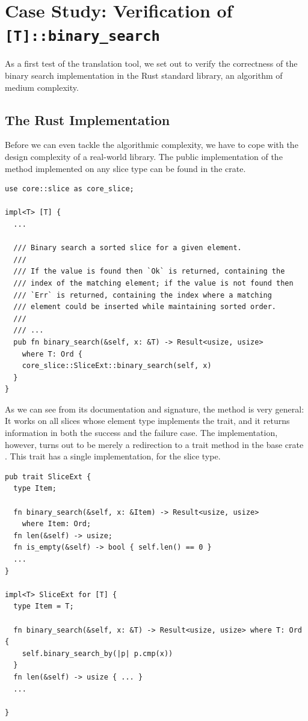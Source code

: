 \section{Case Study: Verification of \texttt{[T]::binary\_search}}
\label{sec:binary_search}

As a first test of the translation tool, we set out to verify the correctness
of the binary search implementation in the Rust standard library, an algorithm of
medium complexity.

\subsection{The Rust Implementation}

Before we can even tackle the algorithmic complexity, we have to cope with the
design complexity of a real-world library. The public implementation of the
 method implemented on any slice type can be found in the  crate.

\begin{verbatim}
use core::slice as core_slice;

impl<T> [T] {
  ...

  /// Binary search a sorted slice for a given element.
  ///
  /// If the value is found then `Ok` is returned, containing the
  /// index of the matching element; if the value is not found then
  /// `Err` is returned, containing the index where a matching
  /// element could be inserted while maintaining sorted order.
  ///
  /// ...
  pub fn binary_search(&self, x: &T) -> Result<usize, usize>
    where T: Ord {
    core_slice::SliceExt::binary_search(self, x)
  }
}
\end{verbatim}

As we can see from its documentation and signature, the method
is very general: It works on all slices whose element type implements the
 trait, and it returns information in both the success and the failure
case. The implementation, however, turns out to be merely a redirection to a
trait method in the base crate . This trait has a single
implementation, for the slice type.

\begin{verbatim}
pub trait SliceExt {
  type Item;

  fn binary_search(&self, x: &Item) -> Result<usize, usize>
    where Item: Ord;
  fn len(&self) -> usize;
  fn is_empty(&self) -> bool { self.len() == 0 }
  ...
}

impl<T> SliceExt for [T] {
  type Item = T;

  fn binary_search(&self, x: &T) -> Result<usize, usize> where T: Ord {
    self.binary_search_by(|p| p.cmp(x))
  }
  fn len(&self) -> usize { ... }
  ...

}
\end{verbatim}

